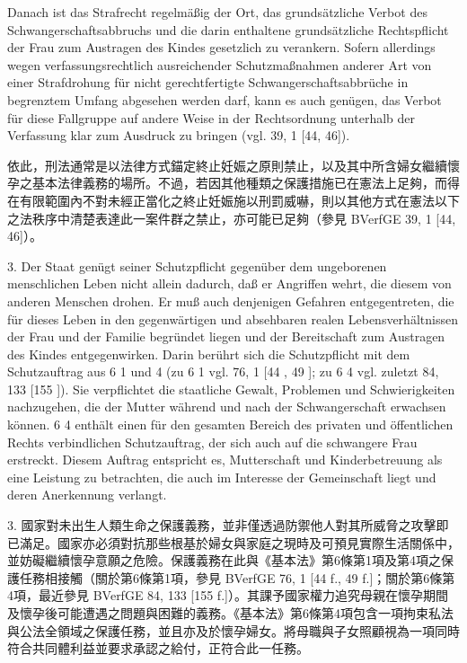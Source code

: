 \documentclass[12pt]{article}
\begin{document}
\begin{sourcepara}[title={原文D.57}]
Danach ist das Strafrecht regelmäßig der Ort, das grundsätzliche Verbot des Schwangerschaftsabbruchs und die darin enthaltene grundsätzliche Rechtspflicht der Frau zum Austragen des Kindes gesetzlich zu verankern. Sofern allerdings wegen verfassungsrechtlich ausreichender Schutzmaßnahmen anderer Art von einer Strafdrohung für nicht gerechtfertigte Schwangerschaftsabbrüche in begrenztem Umfang abgesehen werden darf, kann es auch genügen, das Verbot für diese Fallgruppe auf andere Weise in der Rechtsordnung unterhalb der Verfassung klar zum Ausdruck zu bringen (vgl. \abbrBVerfGE{} 39, 1 [44, 46]).
\end{sourcepara}
\begin{transpara}
依此，刑法通常是以法律方式錨定終止妊娠之原則禁止，以及其中所含婦女繼續懷孕之基本法律義務的場所。不過，若因其他種類之保護措施已在憲法上足夠，而得在有限範圍內不對未經正當化之終止妊娠施以刑罰威嚇，則以其他方式在憲法以下之法秩序中清楚表達此一案件群之禁止，亦可能已足夠（參見 BVerfGE 39, 1 [44, 46]）。
\end{transpara}

\begin{sourcepara}[title={原文D.58}]
3. Der Staat genügt seiner Schutzpflicht gegenüber dem ungeborenen menschlichen Leben nicht allein dadurch, daß er Angriffen wehrt, die diesem von anderen Menschen drohen. Er muß auch denjenigen Gefahren entgegentreten, die für dieses Leben in den gegenwärtigen und absehbaren realen Lebensverhältnissen der Frau und der Familie begründet liegen und der Bereitschaft zum Austragen des Kindes entgegenwirken. Darin berührt sich die Schutzpflicht mit dem Schutzauftrag aus \abbrArt{} 6 \abbrAbs{} 1 und 4 \abbrGG{} (zu \abbrArt{} 6 \abbrAbs{} 1 vgl. \abbrBVerfGE{} 76, 1 [44 \abbrF{}, 49 \abbrF{}]; zu \abbrArt{} 6 \abbrAbs{} 4 vgl. zuletzt \abbrBVerfGE{} 84, 133 [155 \abbrF{}]). Sie verpflichtet die staatliche Gewalt, Problemen und Schwierigkeiten nachzugehen, die der Mutter während und nach der Schwangerschaft erwachsen können. \abbrArt{} 6 \abbrAbs{} 4 \abbrGG{}\ggfnArtSixFourDE{} enthält einen für den gesamten Bereich des privaten und öffentlichen Rechts verbindlichen Schutzauftrag, der sich auch auf die schwangere Frau erstreckt. Diesem Auftrag entspricht es, Mutterschaft und Kinderbetreuung als eine Leistung zu betrachten, die auch im Interesse der Gemeinschaft liegt und deren Anerkennung verlangt.
\end{sourcepara}
\begin{transpara}
3. 國家對未出生人類生命之保護義務，並非僅透過防禦他人對其所威脅之攻擊即已滿足。國家亦必須對抗那些根基於婦女與家庭之現時及可預見實際生活關係中，並妨礙繼續懷孕意願之危險。保護義務在此與《基本法》第6條第1項\ggfnArtSixOneZH{}及第4項\ggfnArtSixFourZH{}之保護任務相接觸（關於第6條第1項，參見 BVerfGE 76, 1 [44 f., 49 f.]；關於第6條第4項，最近參見 BVerfGE 84, 133 [155 f.]）。其課予國家權力追究母親在懷孕期間及懷孕後可能遭遇之問題與困難的義務。《基本法》第6條第4項\ggfnArtSixFourZH{}包含一項拘束私法與公法全領域之保護任務，並且亦及於懷孕婦女。將母職與子女照顧視為一項同時符合共同體利益並要求承認之給付，正符合此一任務。
\end{transpara}
\end{document}

